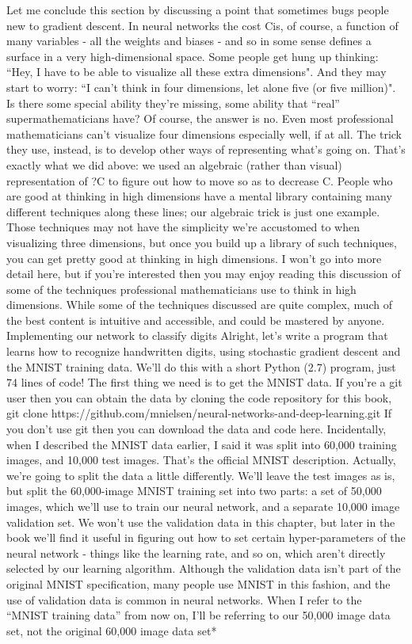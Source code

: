 Let me conclude this section by discussing a point that sometimes bugs people new to gradient descent. In neural networks the cost Cis, of course, a function of many variables - all the weights and biases - and so in some sense defines a surface in a very high-dimensional space. Some people get hung up thinking: ``Hey, I have to be able to visualize all these extra dimensions". And they may start to worry: ``I can't think in four dimensions, let alone five (or five million)". Is there some special ability they're missing, some ability that ``real'' supermathematicians have? Of course, the answer is no. Even most professional mathematicians can't visualize four dimensions especially well, if at all. The trick they use, instead, is to develop other ways of representing what's going on. That's exactly what we did above: we used an algebraic (rather than visual) representation of ?C to figure out how to move so as to decrease C. People who are good at thinking in high dimensions have a mental library containing many different techniques along these lines; our algebraic trick is just one example. Those techniques may not have the simplicity we're accustomed to when visualizing three dimensions, but once you build up a library of such techniques, you can get pretty good at thinking in high dimensions. I won't go into more detail here, but if you're interested then you may enjoy reading this discussion of some of the techniques professional mathematicians use to think in high dimensions. While some of the techniques discussed are quite complex, much of the best content is intuitive and accessible, and could be mastered by anyone.
Implementing our network to classify digits
Alright, let's write a program that learns how to recognize handwritten digits, using stochastic gradient descent and the MNIST training data. We'll do this with a short Python (2.7) program, just 74 lines of code! The first thing we need is to get the MNIST data. If you're a git user then you can obtain the data by cloning the code repository for this book,
git clone https://github.com/mnielsen/neural-networks-and-deep-learning.git
If you don't use git then you can download the data and code here.
Incidentally, when I described the MNIST data earlier, I said it was split into 60,000 training images, and 10,000 test images. That's the official MNIST description. Actually, we're going to split the data a little differently. We'll leave the test images as is, but split the 60,000-image MNIST training set into two parts: a set of 50,000 images, which we'll use to train our neural network, and a separate 10,000 image validation set. We won't use the validation data in this chapter, but later in the book we'll find it useful in figuring out how to set certain hyper-parameters of the neural network - things like the learning rate, and so on, which aren't directly selected by our learning algorithm. Although the validation data isn't part of the original MNIST specification, many people use MNIST in this fashion, and the use of validation data is common in neural networks. When I refer to the ``MNIST training data'' from now on, I'll be referring to our 50,000 image data set, not the original 60,000 image data set* 


